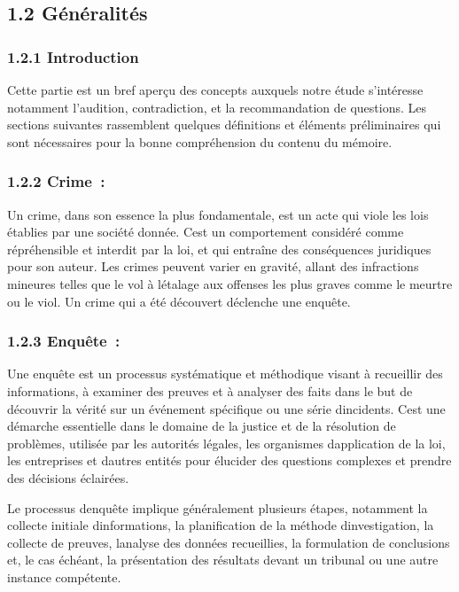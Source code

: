 \documentclass[
]{article}
\begin{document}
\subsection{1.2 Généralités}\label{guxe9nuxe9ralituxe9s}

\subsubsection{1.2.1 Introduction}\label{introduction-1}

Cette partie est un bref aperçu des concepts auxquels notre étude
s'intéresse notamment l'audition, contradiction, et la recommandation de
questions. Les sections suivantes rassemblent quelques définitions et
éléments préliminaires qui sont nécessaires pour la bonne compréhension
du contenu du mémoire.

\subsubsection{1.2.2 Crime~:}\label{crime}

Un crime, dans son essence la plus fondamentale, est un acte qui viole
les lois établies par une société donnée. C\textquotesingle est un
comportement considéré comme répréhensible et interdit par la loi, et
qui entraîne des conséquences juridiques pour son auteur. Les crimes
peuvent varier en gravité, allant des infractions mineures telles que le
vol à l\textquotesingle étalage aux offenses les plus graves comme le
meurtre ou le viol. Un crime qui a été découvert déclenche une enquête.

\subsubsection{1.2.3 Enquête~:}\label{enquuxeate}

Une enquête est un processus systématique et méthodique visant à
recueillir des informations, à examiner des preuves et à analyser des
faits dans le but de découvrir la vérité sur un événement spécifique ou
une série d\textquotesingle incidents. C\textquotesingle est une
démarche essentielle dans le domaine de la justice et de la résolution
de problèmes, utilisée par les autorités légales, les organismes
d\textquotesingle application de la loi, les entreprises et
d\textquotesingle autres entités pour élucider des questions complexes
et prendre des décisions éclairées.

Le processus d\textquotesingle enquête implique généralement plusieurs
étapes, notamment la collecte initiale d\textquotesingle informations,
la planification de la méthode d\textquotesingle investigation, la
collecte de preuves, l\textquotesingle analyse des données recueillies,
la formulation de conclusions et, le cas échéant, la présentation des
résultats devant un tribunal ou une autre instance compétente.
\end{document}
